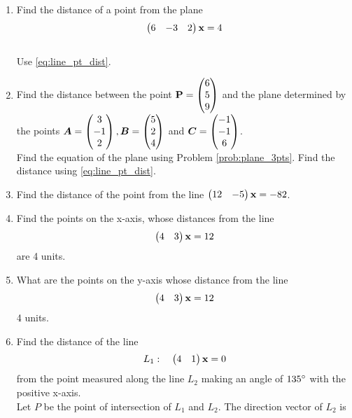 \documentclass[journal,12pt,twocolumn]{IEEEtran}
\renewcommand\thesection{\arabic{section}}
\begin{document}
\begin{enumerate}[label=\thesection.\arabic*.,ref=\thesection.\theenumi]
\item Find the distance of a point  from the plane
\begin{align}
\begin{pmatrix}6 & -3 & 2\end{pmatrix}\mathbf{x}=4
\end{align}
%
\\
\solution Use \eqref{eq:line_pt_dist}.
\item Find the distance between the point $\mathbf{P}=\begin{pmatrix}6\\5\\9\end{pmatrix}$ and the plane determined by the points $\bm{A}=\begin{pmatrix}3\\-1\\2\end{pmatrix}, \bm{B}=\begin{pmatrix}5\\2\\4\end{pmatrix}$ and $\bm{C}=\begin{pmatrix}-1\\-1\\6\end{pmatrix}$.
%
\\
\solution Find the equation of the plane using Problem \ref{prob:plane_3pts}.  Find the distance using \eqref{eq:line_pt_dist}.
%
\item Find the distance of the point  from the line $\begin{pmatrix}12 & -5\end{pmatrix}\mathbf{x} = -82$.
\\
\solution
%
\item Find the points on the x-axis, whose distances from the line 
\begin{align}
\begin{pmatrix}4 & 3\end{pmatrix} \mathbf{x} = 12
\end{align}
are 4 units.
%
\\
\solution
%
\item What are the points on the y-axis whose distance from the line 
%
\begin{align}
\begin{pmatrix}4 & 3\end{pmatrix}\mathbf{x} = 12
\end{align}
%
4 units.
\\
\solution
%
\item Find the distance of the line
\begin{align}
\label{eq:line_L_1}
L_1: \quad \begin{pmatrix}4 & 1\end{pmatrix}\mathbf{x}  = 0
\end{align}
%
from the point  measured along the line $L_2$ making an angle of $135\degree$ with the positive x-axis.
%
\\
\solution  Let $P$ be the point of intersection of $L_1$ and $L_2$.  The direction vector of $L_2$ is 

\end{enumerate}
\end{document}

